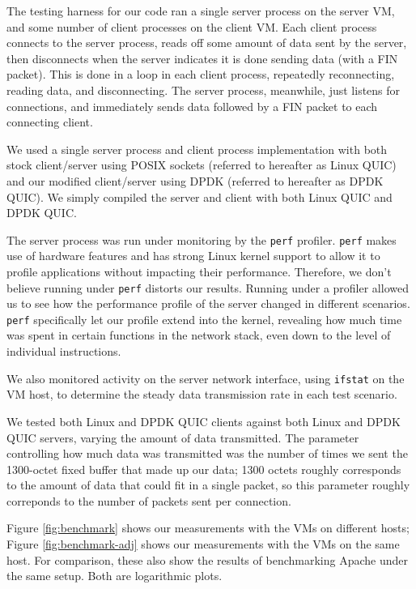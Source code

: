 \documentclass{sig-alternate-05-2015}
\begin{document}
The testing harness for our code ran a single server process on the server VM,
and some number of client processes on the client VM.
Each client process connects to the server process,
reads off some amount of data sent by the server,
then disconnects when the server indicates it is done sending data (with a FIN packet).
This is done in a loop in each client process, repeatedly reconnecting, reading data, and disconnecting.
The server process, meanwhile, just listens for connections,
and immediately sends data followed by a FIN packet to each connecting client.

We used a single server process and client process implementation with both 
stock client/server using POSIX sockets
(referred to hereafter as Linux QUIC)
and our modified client/server using DPDK
(referred to hereafter as DPDK QUIC).
We simply compiled the server and client with both Linux QUIC and DPDK QUIC.

The server process was run under monitoring by the \texttt{perf} profiler.
\texttt{perf} makes use of hardware features and has strong Linux kernel support
to allow it to profile applications without impacting their performance.
Therefore, we don't believe running under \texttt{perf} distorts our results.
Running under a profiler allowed us to see how the performance profile of the server changed in different scenarios.
\texttt{perf} specifically let our profile extend into the kernel,
revealing how much time was spent in certain functions in the network stack,
even down to the level of individual instructions.

We also monitored activity on the server network interface,
using \texttt{ifstat} on the VM host,
to determine the steady data transmission rate in each test scenario.

We tested both Linux and DPDK QUIC clients against both Linux and DPDK QUIC servers,
varying the amount of data transmitted.
The parameter controlling how much data was transmitted was the number of times we sent the 1300-octet fixed buffer that made up our data;
1300 octets roughly corresponds to the amount of data that could fit in a single packet,
so this parameter roughly correponds to the number of packets sent per connection.

Figure \ref{fig:benchmark} shows our measurements with the VMs on different hosts;
Figure \ref{fig:benchmark-adj} shows our measurements with the VMs on the same host.
For comparison, these also show the results of benchmarking Apache under the same setup.
Both are logarithmic plots.
\end{document}
